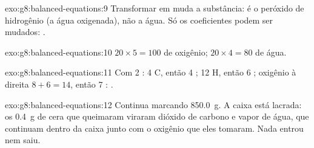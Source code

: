 \begin{solution}{exo:g8:balanced-equations:9}
Transformar  em  muda a substância:  é o
peróxido de hidrogênio (a água oxigenada), não a água. Só os
coeficientes podem ser mudados: .
\end{solution}

\begin{solution}{exo:g8:balanced-equations:10}
$20 \times 5 = 100$  de oxigênio; $20 \times 4 = 80$ 
de água.
\end{solution}

\begin{solution}{exo:g8:balanced-equations:11}
Com 2 : 4 C, então 4 ; 12 H, então 6 ; oxigênio
à direita $8 + 6 = 14$, então 7 :
.
\end{solution}

\begin{solution}{exo:g8:balanced-equations:12}
Continua marcando \qty{850.0}{g}. A caixa está lacrada: os
\qty{0.4}{g} de cera que queimaram viraram dióxido de carbono e vapor de
água, que continuam dentro da caixa junto com o oxigênio que eles
tomaram. Nada entrou nem saiu.
\end{solution}

